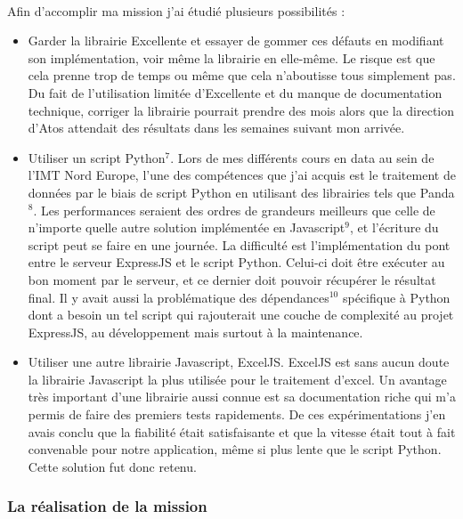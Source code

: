 \documentclass[12pt]{article}
\begin{document}
\begin {sloppypar}
\paragraph {}
Afin d'accomplir ma mission j'ai étudié plusieurs possibilités : 
\begin{itemize}
  \item 
    Garder la librairie Excellente et essayer de gommer ces défauts en modifiant
    son implémentation, voir même la librairie en elle-même. 
    Le risque est que cela prenne trop de temps ou même que cela n'aboutisse tous 
    simplement pas. Du fait de l'utilisation limitée d'Excellente et du manque de documentation 
    technique, corriger la librairie pourrait prendre des mois alors que la direction d'Atos 
    attendait des résultats dans les semaines suivant mon arrivée.
  \item 
    Utiliser un script Python$^{7}$. Lors de mes différents cours en data au sein de l'IMT Nord 
    Europe, l'une des compétences que j'ai acquis est le traitement de données par le biais 
    de script Python en utilisant des librairies tels que Panda$^{8}$. Les performances 
    seraient des ordres de grandeurs meilleurs que celle de n'importe quelle autre solution 
    implémentée en Javascript$^{9}$, et l'écriture du script peut se faire en une journée. 
    La difficulté est l'implémentation du pont entre le serveur ExpressJS et le script Python. 
    Celui-ci doit être exécuter au bon moment par le serveur, et ce dernier doit pouvoir 
    récupérer le résultat final. Il y avait aussi la problématique des dépendances$^{10}$ spécifique
    à Python dont a besoin un tel script qui rajouterait une couche de complexité au projet ExpressJS, au 
    développement mais surtout à la maintenance.
  \item 
    Utiliser une autre librairie Javascript, ExcelJS. ExcelJS est sans aucun doute 
    la librairie Javascript la plus utilisée pour le traitement d'excel. Un avantage très important 
    d'une librairie aussi connue est sa documentation riche qui m'a permis de faire des premiers 
    tests rapidements. De ces expérimentations j'en avais conclu que la fiabilité était 
    satisfaisante et que la vitesse était tout à fait convenable pour notre application, même si 
    plus lente que le script Python. Cette solution fut donc retenu.
\end{itemize}
\newpage
\subsubsection{La réalisation de la mission}

\end{sloppypar}
\end{document}
